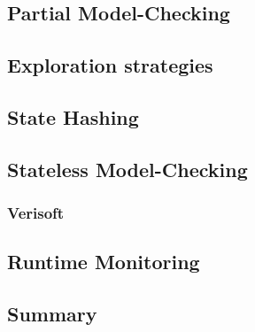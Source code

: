 \documentclass[12pt, a4paper]{book}
\begin{document}
  \subsection{Partial Model-Checking}
  \label{sub:Partial Model-Checking}
  \subsection{Exploration strategies}
  \label{sub:Exploration strategies}
  \subsection{State Hashing}
  \label{sub:State Hashing}
  \subsection{Stateless Model-Checking}
  \label{sub:Stateless Model-Checking}
  \subsubsection{Verisoft}
  \label{subs:Verisoft}
  \subsection{Runtime Monitoring}
  \label{sub:Runtime Monitoring}
  \subsection{Summary}
  \label{sub:Summary}
\end{document}
